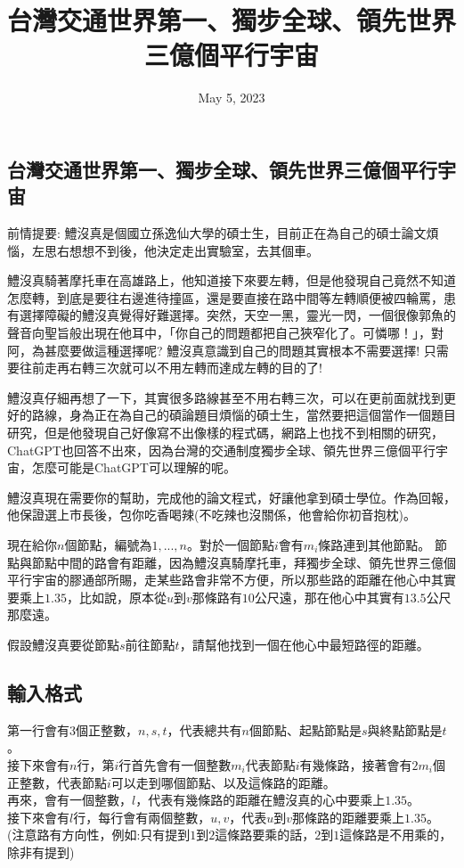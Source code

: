 \documentclass{article}
\title{台灣交通世界第一、獨步全球、領先世界三億個平行宇宙}
\date{May 5, 2023}
\begin{document}
\begin{CJK*}{UTF8}{bsmi}

\maketitle

\section*{台灣交通世界第一、獨步全球、領先世界三億個平行宇宙}

前情提要: 鱧沒真是個國立孫逸仙大學的碩士生，目前正在為自己的碩士論文煩惱，左思右想想不到後，他決定走出實驗室，去其個車。

鱧沒真騎著摩托車在高雄路上，他知道接下來要左轉，但是他發現自己竟然不知道怎麼轉，到底是要往右邊進待撞區，還是要直接在路中間等左轉順便被四輪罵，患有選擇障礙的鱧沒真覺得好難選擇。突然，天空一黑，靈光一閃，一個很像郭魚的聲音向聖旨般出現在他耳中，「你自己的問題都把自己狹窄化了。可憐哪！」，對阿，為甚麼要做這種選擇呢? 鱧沒真意識到自己的問題其實根本不需要選擇! 只需要往前走再右轉三次就可以不用左轉而達成左轉的目的了!

鱧沒真仔細再想了一下，其實很多路線甚至不用右轉三次，可以在更前面就找到更好的路線，身為正在為自己的碩論題目煩惱的碩士生，當然要把這個當作一個題目研究，但是他發現自己好像寫不出像樣的程式碼，網路上也找不到相關的研究，ChatGPT也回答不出來，因為台灣的交通制度獨步全球、領先世界三億個平行宇宙，怎麼可能是ChatGPT可以理解的呢。

鱧沒真現在需要你的幫助，完成他的論文程式，好讓他拿到碩士學位。作為回報，他保證選上市長後，包你吃香喝辣(不吃辣也沒關係，他會給你初音抱枕)。

現在給你$n$個節點，編號為$1,...,n$。對於一個節點$i$會有$m_i$條路連到其他節點。
節點與節點中間的路會有距離，因為鱧沒真騎摩托車，拜獨步全球、領先世界三億個平行宇宙的膠通部所賜，走某些路會非常不方便，所以那些路的距離在他心中其實要乘上$1.35$，比如說，原本從$u$到$v$那條路有$10$公尺遠，那在他心中其實有$13.5$公尺那麼遠。

假設鱧沒真要從節點$s$前往節點$t$，請幫他找到一個在他心中最短路徑的距離。

\subsection*{輸入格式}
第一行會有$3$個正整數，$n,s,t$，代表總共有$n$個節點、起點節點是$s$與終點節點是$t$。\\
接下來會有$n$行，第$i$行首先會有一個整數$m_i$代表節點$i$有幾條路，接著會有$2m_i$個正整數，代表節點$i$可以走到哪個節點、以及這條路的距離。\\
再來，會有一個整數，$l$，代表有幾條路的距離在鱧沒真的心中要乘上$1.35$。\\
接下來會有$l$行，每行會有兩個整數，$u,v$，代表$u$到$v$那條路的距離要乘上$1.35$。(注意路有方向性，例如:只有提到$1$到$2$這條路要乘的話，$2$到$1$這條路是不用乘的，除非有提到)


\end{CJK*}
\end{document}
